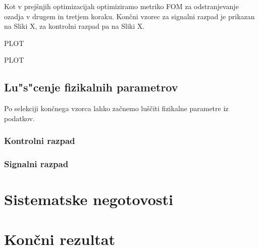 \documentclass[headings=standardclasses,headings=big,oneside,a4paper,openany,12pt]{scrbook}
\begin{document}
\begin{otherlanguage}{slovene}
Kot v prejšnjih optimizacijah optimiziramo metriko FOM za odstranjevanje ozadja v drugem in tretjem koraku. Končni vzorec za signalni razpad je prikazan na Sliki X, za kontrolni razpad pa na Sliki X.

PLOT 

PLOT

\subsection{Lu"s"cenje fizikalnih parametrov}

Po selekciji končnega vzorca lahko začnemo luščiti fizikalne parametre iz podatkov.

\subsubsection{Kontrolni razpad}

\subsubsection{Signalni razpad}

\section{Sistematske negotovosti}

\section{Kon\v cni rezultat}

\end{otherlanguage}
\end{document}
